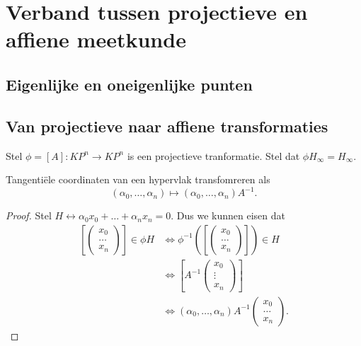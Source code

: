 \section{Verband tussen projectieve en affiene meetkunde} \label{sec:verband_tussen_projectieve_en_affiene_meetkunde}
\subsection{Eigenlijke en oneigenlijke punten} \label{sec:eigenlijke_en_oneigenlijke_punten}

\subsection{Van projectieve naar affiene transformaties} \label{sec:van_projectieve_naar_affiene_transformaties}
Stel $\phi = [A]: KP^{n} \to KP^{n}$ is een projectieve tranformatie. 
Stel dat $\phi H_\infty = H_\infty$.
\begin{lemma}
	Tangenti\"ele coordinaten van een hypervlak transfomreren als \[
		(\alpha_0, \ldots, \alpha_n) \mapsto  (\alpha_0, \ldots, \alpha_n) A^{-1}
	.\] 
\end{lemma}
\begin{proof}
	Stel $H \leftrightarrow \alpha_0 x_0 + \ldots + \alpha_n x_n = 0$. Dus we kunnen eisen dat 
	\begin{align*}
		\left[ \begin{pmatrix} x_0 \\ \ldots \\ x_n   \end{pmatrix}  \right]  \in \phi H &\iff \phi^{-1}\left( \left[ \begin{pmatrix} x_0 \\ \ldots \\ x_n \end{pmatrix}  \right]  \right) \in H \\
		&\iff \left[ A^{-1} \begin{pmatrix} x_0 \\ \vdots \\ x_n \end{pmatrix}  \right] \\
		&\iff (\alpha_0, \ldots, \alpha_n) A^{-1} \begin{pmatrix} x_0 \\ \ldots \\ x_n \end{pmatrix} 
	.\end{align*}
\end{proof}

